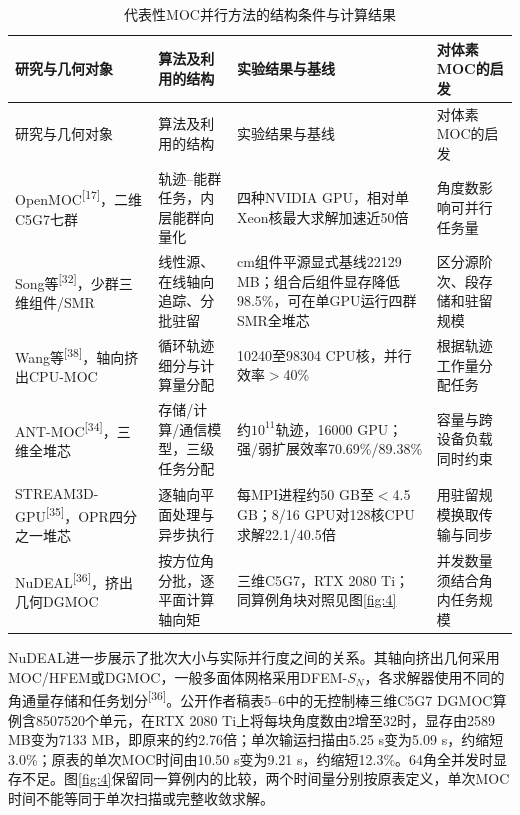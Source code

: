 \documentclass[UTF8, zihao=-4, fontset=none, a4paper]{ctexart}
\newcommand{\upcite}[1]{\textsuperscript{[#1]}}
\begin{document}
\begin{longtable}{@{}>{\raggedright\arraybackslash}p{}>{\raggedright\arraybackslash}p{}>{\raggedright\arraybackslash}p{}>{\raggedright\arraybackslash}p{}@{}}
\caption{代表性MOC并行方法的结构条件与计算结果}\label{tab:2}\\
\toprule
研究与几何对象 & 算法及利用的结构 & 实验结果与基线 & 对体素MOC的启发 \\
\midrule
\endfirsthead
\toprule
研究与几何对象 & 算法及利用的结构 & 实验结果与基线 & 对体素MOC的启发 \\
\midrule
\endhead
\bottomrule
\endlastfoot
OpenMOC\upcite{17}，二维C5G7七群 & 轨迹--能群任务，内层能群向量化 & 四种NVIDIA GPU，相对单Xeon核最大求解加速近50倍 & 角度数影响可并行任务量 \\
Song等\upcite{32}，少群三维组件/SMR & 线性源、在线轴向追踪、分批驻留 & 25 cm组件平源显式基线22129 MB；组合后组件显存降低98.5\%，可在单GPU运行四群SMR全堆芯 & 区分源阶次、段存储和驻留规模 \\
Wang等\upcite{38}，轴向挤出CPU-MOC & 循环轨迹细分与计算量分配 & 10240至98304 CPU核，并行效率$>$40\% & 根据轨迹工作量分配任务 \\
ANT-MOC\upcite{34}，三维全堆芯 & 存储/计算/通信模型，三级任务分配 & 约$10^{11}$轨迹，16000 GPU；强/弱扩展效率70.69\%/89.38\% & 容量与跨设备负载同时约束 \\
STREAM3D-GPU\upcite{35}，OPR四分之一堆芯 & 逐轴向平面处理与异步执行 & 每MPI进程约50 GB至$<$4.5 GB；8/16 GPU对128核CPU求解22.1/40.5倍 & 用驻留规模换取传输与同步 \\
NuDEAL\upcite{36}，挤出几何DGMOC & 按方位角分批，逐平面计算轴向矩 & 三维C5G7，RTX 2080 Ti；同算例角块对照见图\ref{fig:4} & 并发数量须结合角内任务规模 \\
\end{longtable}

NuDEAL进一步展示了批次大小与实际并行度之间的关系。其轴向挤出几何采用MOC/HFEM或DGMOC，一般多面体网格采用DFEM-$S_N$，各求解器使用不同的角通量存储和任务划分\upcite{36}。公开作者稿表5--6中的无控制棒三维C5G7 DGMOC算例含8507520个单元，在RTX 2080 Ti上将每块角度数由2增至32时，显存由2589 MB变为7133 MB，即原来的约2.76倍；单次输运扫描由5.25 s变为5.09 s，约缩短3.0\%；原表的单次MOC时间由10.50 s变为9.21 s，约缩短12.3\%。64角全并发时显存不足。图\ref{fig:4}保留同一算例内的比较，两个时间量分别按原表定义，单次MOC时间不能等同于单次扫描或完整收敛求解。
\end{document}
